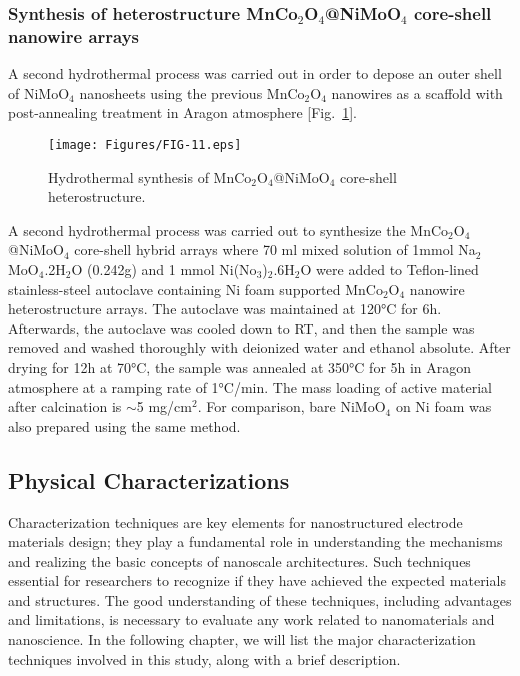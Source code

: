 \documentclass[reprint,amsmath,amssymb,aps,floatfix,
]{revtex4-2}
\begin{document}
\subsubsection{Synthesis of heterostructure MnCo$_2$O$_4$@NiMoO$_4$ core-shell nanowire arrays}
A second hydrothermal process was carried out in order to depose an outer shell of NiMoO$_4$ nanosheets using the previous MnCo$_2$O$_4$ nanowires as a scaffold with post-annealing treatment in Aragon atmosphere [Fig.~\ref{fig:fig11}].
\begin{figure}[t]
    \centering
    \texttt{[image: Figures/FIG-11.eps]}
    \caption{\label{fig:fig11}Hydrothermal synthesis of MnCo$_2$O$_4$@NiMoO$_4$ core-shell heterostructure.}
    \end{figure}
A second hydrothermal process was carried out to synthesize the MnCo$_2$O$_4$@NiMoO$_4$ core-shell hybrid arrays where 70 ml mixed solution of 1mmol Na$_2$MoO$_4$.2H$_2$O (0.242g) and 1 mmol Ni(No$_3$)$_2$.6H$_2$O were added to Teflon-lined stainless-steel autoclave containing Ni foam supported MnCo$_2$O$_4$ nanowire heterostructure arrays. The autoclave was maintained at \ang{120}C for 6h. Afterwards, the autoclave was cooled down to RT, and then the sample was removed and washed thoroughly with deionized water and ethanol absolute. After drying for 12h at \ang{70}C, the sample was annealed at \ang{350}C for 5h in Aragon atmosphere at a ramping rate of \ang{1}C/min. The mass loading of active material after calcination is  $\sim$5 mg/cm$^2$. For comparison, bare NiMoO$_4$ on Ni foam was also prepared using the same method.\subsection{\label{sec:level3}Physical Characterizations}
Characterization techniques are key elements for nanostructured electrode materials design; they play a fundamental role in understanding the mechanisms and realizing the basic concepts of nanoscale architectures. Such techniques essential for researchers to recognize if they have achieved the expected materials and structures. The good understanding of these techniques, including advantages and limitations, is necessary to evaluate any work related to nanomaterials and nanoscience. In the following chapter, we will list the major characterization techniques involved in this study, along with a brief description.
\end{document}
